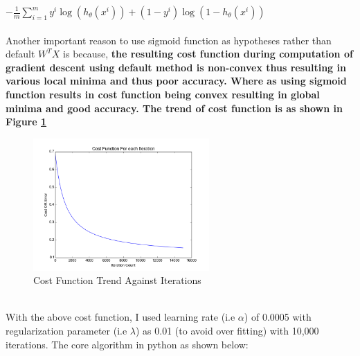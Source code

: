 \documentclass[11pt, pdftex]{article}
\begin{document}
$-\frac{1}{m}\sum_{i=1}^{m}y^{i}\log(h_\theta(x^{i}))+(1-y^{i})\log(1-h_\theta(x^{i}))$
\\
\\
Another important reason to use sigmoid function as hypotheses rather than default $W^{T}X$ is because, {\bf the resulting cost function during computation of gradient descent using default method is non-convex thus resulting in various local minima and thus poor accuracy. Where as using sigmoid function results in cost function being convex resulting in global minima and good accuracy. The trend of cost function is as shown in Figure \ref{fig:costf}}
\\
\begin{figure}
    \centering
    \includegraphics[width=0.6\textwidth]{pics/costf.png} 
    \caption{Cost Function Trend Against Iterations}
    \label{fig:costf}
\end{figure}
\\
With the above cost function, I used learning rate (i.e $\alpha$) of 0.0005 with regularization parameter (i.e $\lambda$) as 0.01 (to avoid over fitting) with 10,000 iterations. The core algorithm in python as shown below:
\end{document}
